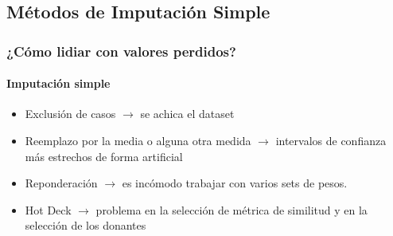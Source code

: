 \documentclass{beamer}
\begin{document}
\subsection{Métodos de Imputación Simple}
\begin{frame}
	\frametitle{¿Cómo lidiar con valores perdidos?}
	\framesubtitle{Imputación simple}
		\begin{itemize}
			\item Exclusión de casos $\rightarrow$ se achica el dataset			\item Reemplazo por la media o alguna otra medida $\rightarrow$ intervalos de confianza más estrechos de forma artificial
			\item Reponderación $\rightarrow$ es incómodo trabajar con varios sets de pesos.
			\item Hot Deck $\rightarrow$ problema en la selección de métrica de similitud y en la selección de los donantes
		\end{itemize}
\end{frame}
\end{document}
